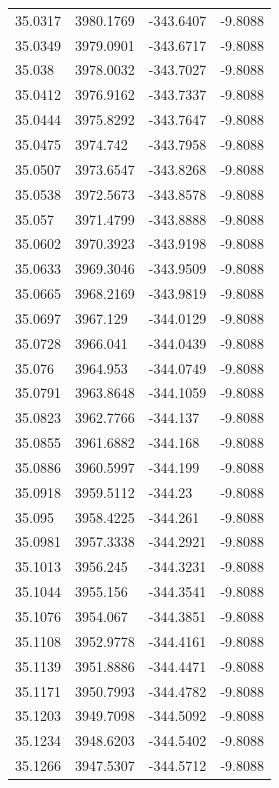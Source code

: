 \begin{table}[H]
\begin{tabular}{llll}
35.0317 & 3980.1769 & -343.6407 & -9.8088 \\
35.0349 & 3979.0901 & -343.6717 & -9.8088 \\
35.038 & 3978.0032 & -343.7027 & -9.8088 \\
35.0412 & 3976.9162 & -343.7337 & -9.8088 \\
35.0444 & 3975.8292 & -343.7647 & -9.8088 \\
35.0475 & 3974.742 & -343.7958 & -9.8088 \\
35.0507 & 3973.6547 & -343.8268 & -9.8088 \\
35.0538 & 3972.5673 & -343.8578 & -9.8088 \\
35.057 & 3971.4799 & -343.8888 & -9.8088 \\
35.0602 & 3970.3923 & -343.9198 & -9.8088 \\
35.0633 & 3969.3046 & -343.9509 & -9.8088 \\
35.0665 & 3968.2169 & -343.9819 & -9.8088 \\
35.0697 & 3967.129 & -344.0129 & -9.8088 \\
35.0728 & 3966.041 & -344.0439 & -9.8088 \\
35.076 & 3964.953 & -344.0749 & -9.8088 \\
35.0791 & 3963.8648 & -344.1059 & -9.8088 \\
35.0823 & 3962.7766 & -344.137 & -9.8088 \\
35.0855 & 3961.6882 & -344.168 & -9.8088 \\
35.0886 & 3960.5997 & -344.199 & -9.8088 \\
35.0918 & 3959.5112 & -344.23 & -9.8088 \\
35.095 & 3958.4225 & -344.261 & -9.8088 \\
35.0981 & 3957.3338 & -344.2921 & -9.8088 \\
35.1013 & 3956.245 & -344.3231 & -9.8088 \\
35.1044 & 3955.156 & -344.3541 & -9.8088 \\
35.1076 & 3954.067 & -344.3851 & -9.8088 \\
35.1108 & 3952.9778 & -344.4161 & -9.8088 \\
35.1139 & 3951.8886 & -344.4471 & -9.8088 \\
35.1171 & 3950.7993 & -344.4782 & -9.8088 \\
35.1203 & 3949.7098 & -344.5092 & -9.8088 \\
35.1234 & 3948.6203 & -344.5402 & -9.8088 \\
35.1266 & 3947.5307 & -344.5712 & -9.8088 \\

\end{tabular}
\end{table}
